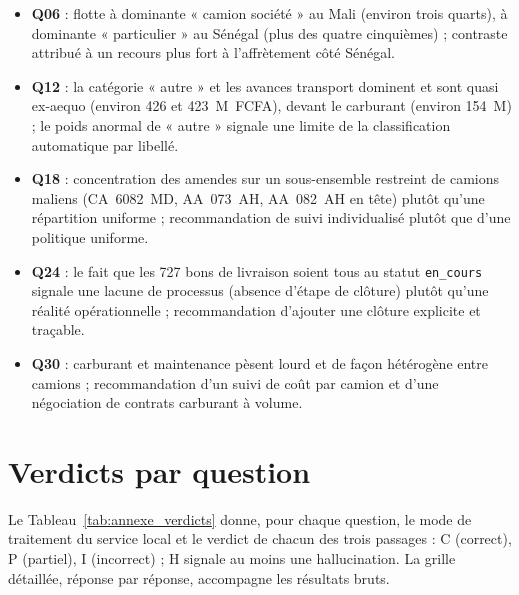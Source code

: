 \begin{itemize}
    \item \textbf{Q06} : flotte à dominante « camion société » au Mali (environ trois quarts), à dominante « particulier » au Sénégal (plus des quatre cinquièmes) ; contraste attribué à un recours plus fort à l'affrètement côté Sénégal.
    \item \textbf{Q12} : la catégorie « autre » et les avances transport dominent et sont quasi ex-aequo (environ 426 et 423~M~FCFA), devant le carburant (environ 154~M) ; le poids anormal de « autre » signale une limite de la classification automatique par libellé.
    \item \textbf{Q18} : concentration des amendes sur un sous-ensemble restreint de camions maliens (CA~6082~MD, AA~073~AH, AA~082~AH en tête) plutôt qu'une répartition uniforme ; recommandation de suivi individualisé plutôt que d'une politique uniforme.
    \item \textbf{Q24} : le fait que les 727 bons de livraison soient tous au statut \texttt{en\_cours} signale une lacune de processus (absence d'étape de clôture) plutôt qu'une réalité opérationnelle ; recommandation d'ajouter une clôture explicite et traçable.
    \item \textbf{Q30} : carburant et maintenance pèsent lourd et de façon hétérogène entre camions ; recommandation d'un suivi de coût par camion et d'une négociation de contrats carburant à volume.
\end{itemize}


\section{Verdicts par question}

Le Tableau~\ref{tab:annexe_verdicts} donne, pour chaque question, le mode de traitement du service local et le verdict de chacun des trois passages : C (correct), P (partiel), I (incorrect) ; H signale au moins une hallucination. La grille détaillée, réponse par réponse, accompagne les résultats bruts.

